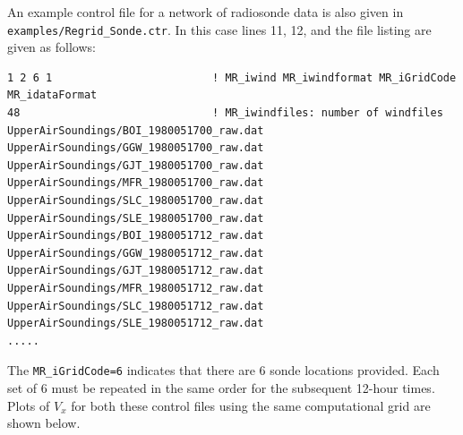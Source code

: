 \documentclass[11pt]{article}   %
\begin{document}
An example control file for a network of radiosonde data is also given in
\texttt{examples/Regrid\_Sonde.ctr}.  In this case lines 11, 12, and the file listing are given as
follows:
\footnotesize
\begin{verbatim}
1 2 6 1                         ! MR_iwind MR_iwindformat MR_iGridCode MR_idataFormat
48                              ! MR_iwindfiles: number of windfiles
UpperAirSoundings/BOI_1980051700_raw.dat
UpperAirSoundings/GGW_1980051700_raw.dat
UpperAirSoundings/GJT_1980051700_raw.dat
UpperAirSoundings/MFR_1980051700_raw.dat
UpperAirSoundings/SLC_1980051700_raw.dat
UpperAirSoundings/SLE_1980051700_raw.dat
UpperAirSoundings/BOI_1980051712_raw.dat
UpperAirSoundings/GGW_1980051712_raw.dat
UpperAirSoundings/GJT_1980051712_raw.dat
UpperAirSoundings/MFR_1980051712_raw.dat
UpperAirSoundings/SLC_1980051712_raw.dat
UpperAirSoundings/SLE_1980051712_raw.dat
.....
\end{verbatim}
\normalsize
The \texttt{MR\_iGridCode=6} indicates that there are 6 sonde locations provided.  Each set of 6
must be repeated in the same order for the subsequent 12-hour times.  Plots of $V_x$ for
both these control files using the same computational grid are shown below.
\end{document}
